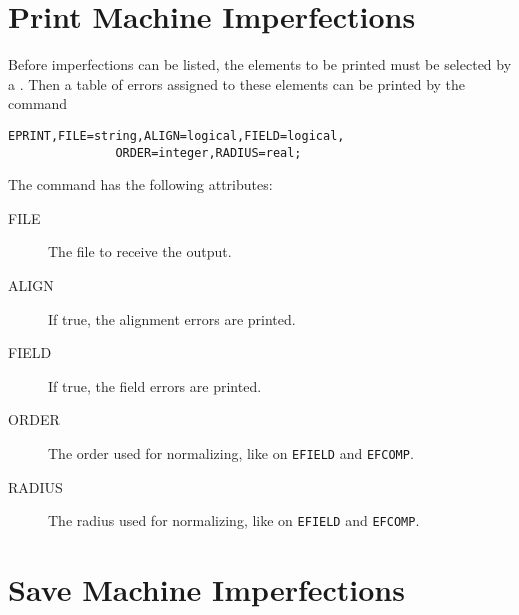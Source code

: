 \section{Print Machine Imperfections}
\label{sec:errorprint}

Before imperfections can be listed, 
the elements to be printed must be selected by a
.
Then a table of errors assigned to these elements can be printed 
by the command
\begin{verbatim}
EPRINT,FILE=string,ALIGN=logical,FIELD=logical,
               ORDER=integer,RADIUS=real;
\end{verbatim}
The command has the following attributes:
\begin{description}
\item[FILE]
  The file to receive the output.
\item[ALIGN]
  If true, the alignment errors are printed.
\item[FIELD]
  If true, the field errors are printed.
\item[ORDER]
  The order used for normalizing, like on \texttt{EFIELD} and
  \texttt{EFCOMP}. 
\item[RADIUS]
  The radius used for normalizing, like on \texttt{EFIELD} and
  \texttt{EFCOMP}.
\end{description}

\section{Save Machine Imperfections}
\label{sec:errorsave}

